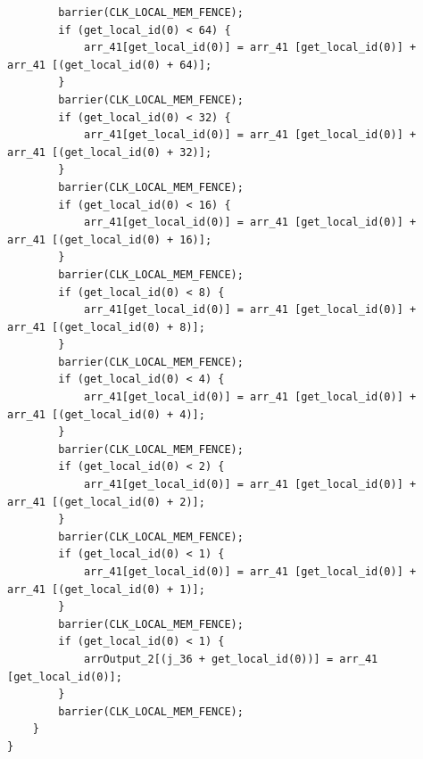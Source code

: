 \documentclass{beamer}
\begin{document}
\begin{frame}[fragile]
{\begin{verbatim}
        barrier(CLK_LOCAL_MEM_FENCE);
        if (get_local_id(0) < 64) {
            arr_41[get_local_id(0)] = arr_41 [get_local_id(0)] + arr_41 [(get_local_id(0) + 64)];
        }
        barrier(CLK_LOCAL_MEM_FENCE);
        if (get_local_id(0) < 32) {
            arr_41[get_local_id(0)] = arr_41 [get_local_id(0)] + arr_41 [(get_local_id(0) + 32)];
        }
        barrier(CLK_LOCAL_MEM_FENCE);
        if (get_local_id(0) < 16) {
            arr_41[get_local_id(0)] = arr_41 [get_local_id(0)] + arr_41 [(get_local_id(0) + 16)];
        }
        barrier(CLK_LOCAL_MEM_FENCE);
        if (get_local_id(0) < 8) {
            arr_41[get_local_id(0)] = arr_41 [get_local_id(0)] + arr_41 [(get_local_id(0) + 8)];
        }
        barrier(CLK_LOCAL_MEM_FENCE);
        if (get_local_id(0) < 4) {
            arr_41[get_local_id(0)] = arr_41 [get_local_id(0)] + arr_41 [(get_local_id(0) + 4)];
        }
        barrier(CLK_LOCAL_MEM_FENCE);
        if (get_local_id(0) < 2) {
            arr_41[get_local_id(0)] = arr_41 [get_local_id(0)] + arr_41 [(get_local_id(0) + 2)];
        }
        barrier(CLK_LOCAL_MEM_FENCE);
        if (get_local_id(0) < 1) {
            arr_41[get_local_id(0)] = arr_41 [get_local_id(0)] + arr_41 [(get_local_id(0) + 1)];
        }
        barrier(CLK_LOCAL_MEM_FENCE);
        if (get_local_id(0) < 1) {
            arrOutput_2[(j_36 + get_local_id(0))] = arr_41 [get_local_id(0)];
        }
        barrier(CLK_LOCAL_MEM_FENCE);
    }
}
\end{verbatim}}

\end{frame}
\backupend
\end{document}
